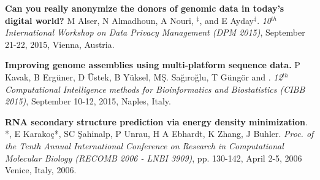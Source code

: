 \vspace{-.2cm}
{\bf Can you really anonymize the donors of genomic data in today's digital world?}
M Alser, N Almadhoun, A Nouri, \calkan{}$^\ddag$, and E Ayday$^\ddag$. 
{\em 10$^{th}$ International Workshop on Data Privacy Management (DPM 2015)}, 
 September 21-22, 2015, Vienna, Austria.

\vspace{-.2cm}

{\bf Improving genome assemblies using multi-platform sequence data.}
P Kavak, B Ergüner, D Üstek, B Yüksel, MŞ. Sağıroğlu, T Güngör and \calkan{}.
{\em 12$^{th}$ Computational Intelligence methods for Bioinformatics and Biostatistics (CIBB 2015)}, 
 September 10-12, 2015, Naples, Italy.










\vspace{-.2cm}
{\bf RNA secondary structure prediction via energy density minimization}.
\calkan{}*, E Karako\c{c}*, SC \c{S}ahinalp, P Unrau,
H A Ebhardt, K Zhang, J Buhler.
{\em Proc. of the Tenth Annual International Conference on Research in Computational Molecular Biology
  (RECOMB 2006 - LNBI 3909)}, pp. 130-142,
  April 2-5, 2006 Venice, Italy, 2006.


